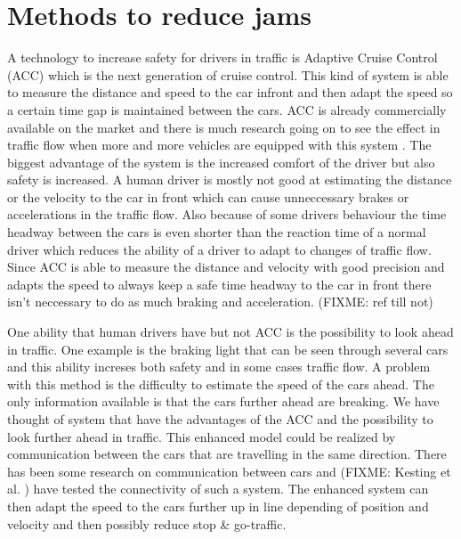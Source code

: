 \section{Methods to reduce jams}
A technology to increase safety for drivers in traffic is Adaptive Cruise Control (ACC) which is the next generation of cruise control. This kind of system is able to measure the distance and speed to the car infront and then adapt the speed so a certain time gap is maintained between the cars. ACC is already commercially available on the market and there is much research going on to see the effect in traffic flow when more and more vehicles are equipped with this system \cite{acc}. The biggest advantage of the system is the increased comfort of the driver but also safety is increased. A human driver is mostly not good at estimating the distance or the velocity to the car in front which can cause unneccessary brakes or accelerations in the traffic flow. Also because of some drivers behaviour the time headway between the cars is even shorter than the reaction time of a normal driver which reduces the ability of a driver to adapt to changes of traffic flow. Since ACC is able to measure the distance and velocity with good precision and adapts the speed to always keep a safe time headway to the car in front there isn't neccessary to do as much braking and acceleration. (FIXME: ref till not)

One ability that human drivers have but not ACC is the possibility to look ahead in traffic. One example is the braking light that can be seen through several cars and this ability increses both safety and in some cases traffic flow. A problem with this method is the difficulty to estimate the speed of the cars ahead. The only information available is that the cars further ahead are breaking. We have thought of system that have the advantages of the ACC and the possibility to look further ahead in traffic. This enhanced model could be realized by communication between the cars that are travelling in the same direction. There has been some research on communication between cars and (FIXME: Kesting et al. ) have tested the connectivity of such a system. The enhanced system can then adapt the speed to the cars further up in line depending of position and velocity and then possibly reduce stop \& go-traffic.
